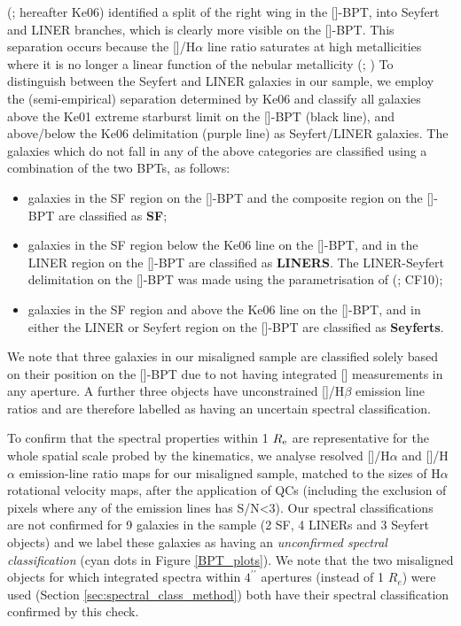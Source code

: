\documentclass[fleqn,usenatbib]{mnras}
\begin{document}
\citeauthor{Kewley2006} (\citeyear{Kewley2006}; hereafter Ke06) identified a split of the right wing in the []-BPT, into Seyfert and LINER branches, which is clearly more visible on the []-BPT. This separation occurs because the []/H$\alpha$ line ratio saturates at high metallicities where it is no longer a linear function of the nebular metallicity (\citealt{KewleyDopita2002}; \citealt*{Denicolo2002})
To distinguish between the Seyfert and LINER galaxies in our sample, we employ the (semi-empirical) separation determined by Ke06 and classify all galaxies above the Ke01 extreme starburst limit on the []-BPT (black line), and above/below the Ke06 delimitation (purple line) as Seyfert/LINER galaxies. The galaxies which do not fall in any of the above categories are classified using a combination of the two BPTs, as follows:

\begin{itemize}
\item galaxies in the SF region on the []-BPT and the composite region on the []-BPT are classified as \textbf{SF};
\item galaxies in the SF region below the Ke06 line on the []-BPT, and in the LINER region on the []-BPT are classified  as \textbf{LINERS}. The LINER-Seyfert delimitation on the []-BPT was made using the parametrisation of \citeauthor{RCidFernandes2010} (\citeyear{RCidFernandes2010}; CF10);  
\item galaxies in the SF region and above the Ke06 line on the []-BPT, and in either the LINER or Seyfert region on the []-BPT are classified  as \textbf{Seyferts}.  
\end{itemize}

We note that three galaxies in our misaligned sample are classified solely based on their position on the []-BPT due to not having integrated [] measurements in any aperture. A further three objects have unconstrained []/H$\beta$ emission line ratios and are therefore labelled as having an uncertain spectral classification.

To confirm that the spectral properties within 1 $R_{\rm{e}}$ are representative for the whole spatial scale probed by the kinematics, we analyse resolved []/H$\alpha$ and []/H$\alpha$ emission-line ratio maps for our misaligned sample, matched to the sizes of H$\alpha$ rotational velocity maps, after the application of QCs (including the exclusion of pixels where any of the emission lines has S/N<3). Our spectral classifications are not confirmed for 9 galaxies in the sample (2 SF, 4 LINERs and 3 Seyfert objects) and we label these galaxies as having an \textit{unconfirmed spectral classification} (cyan dots in Figure \ref{BPT_plots}). We note that the two misaligned objects for which integrated spectra within $4^{\prime \prime}$ apertures (instead of 1 $R_{e}$) were used (Section \ref{sec:spectral_class_method}) both have their spectral classification confirmed by this check.
\end{document}
